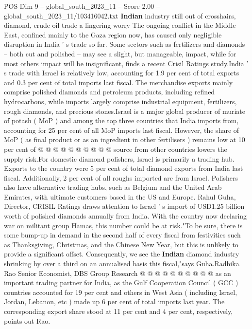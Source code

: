 \begin{textsample}{POS Dim 9 – global\_south\_2023\_11 – Score 2.00 – global\_south\_2023\_11/103416042.txt}  \label{ex:f9_pos_133}
\textbf{Indian} industry still out of crosshairs, diamond, crude oil trade a lingering worry The ongoing conflict in the Middle East, confined mainly to the Gaza region now, has caused only negligible disruption in India ' s trade so far.
Some sectors such as fertilizers and diamonds -- both cut and polished -- may see a slight, but manageable, impact, while for most others impact will be insignificant, finds a recent Crisil Ratings study.India ' s trade with Israel is relatively low, accounting for 1.9 per cent of total exports and 0.3 per cent of total imports last fiscal.
The merchandise exports mainly comprise polished diamonds and petroleum products, including refined hydrocarbons, while imports largely comprise industrial equipment, fertilizers, rough diamonds, and precious stones.Israel is a major global producer of muriate of potash ( MoP ) and among the top three countries that India imports from, accounting for 25 per cent of all MoP imports last fiscal.
However, the share of MoP ( as final product or as an ingredient in other fertilisers ) remains low at 10 per cent of @ @ @ @ @ @ @ @ @ @ source from other countries lowers the supply risk.For domestic diamond polishers, Israel is primarily a trading hub.
Exports to the country were 5 per cent of total diamond exports from India last fiscal.
Additionally, 2 per cent of all roughs imported are from Israel.
Polishers also have alternative trading hubs, such as Belgium and the United Arab Emirates, with ultimate customers based in the US and Europe.
Rahul Guha, Director, CRISIL Ratings draws attention to Israel ' s import of USD1.25 billion worth of polished diamonds annually from India.
With the country now declaring war on militant group Hamas, this number could be at risk."To be sure, there is some bump-up in demand in the second half of every fiscal from festivities such as Thanksgiving, Christmas, and the Chinese New Year, but this is unlikely to provide a significant offset.
Consequently, we see the \textbf{Indian} diamond industry shrinking by over a third on an annualised basis this fiscal,"says Guha.Radhika Rao Senior Economist, DBS Group Research @ @ @ @ @ @ @ @ @ @ as an important trading partner for India, as the Gulf Cooperation Council ( GCC ) countries accounted for 19 per cent and others in West Asia ( including Israel, Jordan, Lebanon, etc ) made up 6 per cent of total imports last year.
The corresponding export share stood at 11 per cent and 4 per cent, respectively, points out Rao.

\end{textsample}
